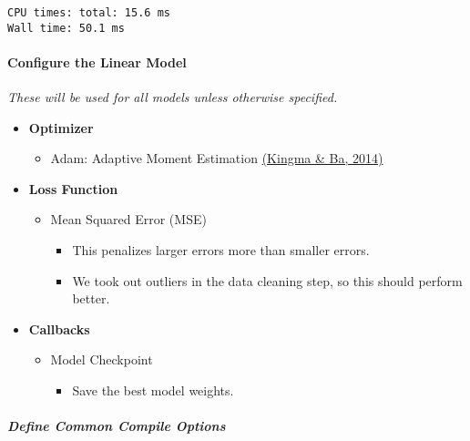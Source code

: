 \documentclass[11pt]{article}
\providecommand{\tightlist}{%
      \setlength{\itemsep}{0pt}\setlength{\parskip}{0pt}}
\begin{document}
    
    \begin{Verbatim}[commandchars=\\\{\}]
CPU times: total: 15.6 ms
Wall time: 50.1 ms
    \end{Verbatim}

    \paragraph{Configure the Linear Model}\label{configure-the-linear-model}

\emph{These will be used for all models unless otherwise specified.}

\begin{itemize}
\tightlist
\item
  \textbf{Optimizer}

  \begin{itemize}
  \tightlist
  \item
    Adam: Adaptive Moment Estimation
    \href{https://arxiv.org/abs/1412.6980}{(Kingma \& Ba, 2014)}
  \end{itemize}
\item
  \textbf{Loss Function}

  \begin{itemize}
  \tightlist
  \item
    Mean Squared Error (MSE)

    \begin{itemize}
    \tightlist
    \item
      This penalizes larger errors more than smaller errors.
    \item
      We took out outliers in the data cleaning step, so this should
      perform better.
    \end{itemize}
  \end{itemize}
\item
  \textbf{Callbacks}

  \begin{itemize}
  \tightlist
  \item
    Model Checkpoint

    \begin{itemize}
    \tightlist
    \item
      Save the best model weights.
    \end{itemize}
  \end{itemize}
\end{itemize}

\subparagraph{Define Common Compile
Options}\label{define-common-compile-options}
\end{document}
